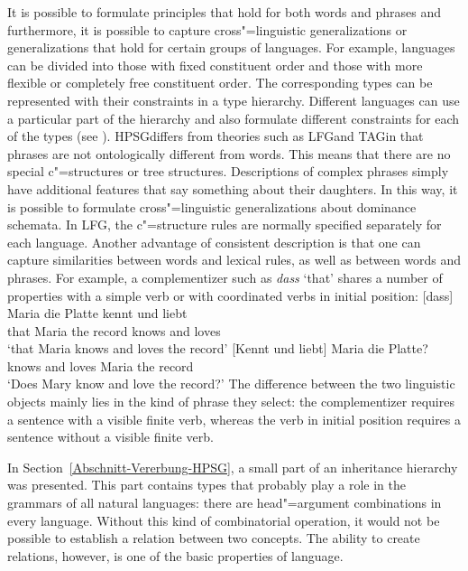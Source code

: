 It is possible to formulate principles that hold for both words and phrases and furthermore, it is possible to capture
cross"=linguistic generalizations or generalizations that hold for certain groups of languages. For example, languages can be divided
into those with fixed constituent order and those with more flexible or completely free constituent order. The corresponding types can be represented
with their constraints in a type hierarchy. Different languages can use a particular part of the hierarchy and also formulate
different constraints for each of the types (see \citealp[Section~9.2]{AW98a}).
HPSG\indexhpsg differs from theories such as LFG\indexlfg and TAG\indextag in that phrases are not
ontologically different from words. This means that there are no special c"=structures or tree structures. Descriptions of complex phrases simply have additional
features that say something about their daughters. In this way, it is possible to formulate cross"=linguistic generalizations
about dominance schemata. In LFG, the c"=structure rules are normally specified separately for each language.
Another advantage of consistent description is that one can capture similarities between words and
lexical rules, as well as between words and phrases. For example, a complementizer such as \emph{dass} `that' shares a number of
properties with a simple verb or with coordinated verbs in initial position:
\eal
\ex
\gll {}[dass] Maria die Platte kennt und liebt\\
	 {}\spacebr{}that Maria the record knows and loves\\
\glt `that Maria knows and loves the record'
\ex 
\gll {}[Kennt und liebt] Maria die Platte?\\
	 {}\spacebr{}knows and loves Maria the record\\
\glt `Does Mary know and love the record?'
\zl
The difference between the two linguistic objects mainly lies in the kind of phrase they select: the complementizer requires a sentence
with a visible finite verb, whereas the verb in initial position requires a sentence without a visible finite verb.

In Section~\ref{Abschnitt-Vererbung-HPSG}, a small part of an inheritance hierarchy was
presented. This part contains types
that probably play a role in the grammars of all natural languages: there are head"=argument combinations in every language. Without this
kind of combinatorial operation, it would not be possible to establish a relation between two concepts. The ability to create relations, however, is
one of the basic properties of language.

